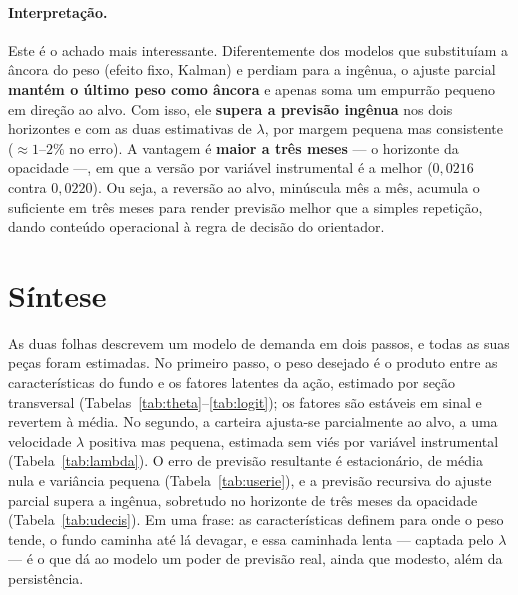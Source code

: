\documentclass[11pt,a4paper]{article}
\begin{document}
\paragraph{Interpretação.} Este é o achado mais interessante. Diferentemente dos modelos que
substituíam a âncora do peso (efeito fixo, Kalman) e perdiam para a ingênua, o ajuste parcial
\textbf{mantém o último peso como âncora} e apenas soma um empurrão pequeno em direção ao alvo. Com
isso, ele \textbf{supera a previsão ingênua} nos dois horizontes e com as duas estimativas de
$\lambda$, por margem pequena mas consistente ($\approx1$--$2\%$ no erro). A vantagem é \textbf{maior
a três meses} --- o horizonte da opacidade ---, em que a versão por variável instrumental é a melhor
($0{,}0216$ contra $0{,}0220$). Ou seja, a reversão ao alvo, minúscula mês a mês, acumula o
suficiente em três meses para render previsão melhor que a simples repetição, dando conteúdo
operacional à regra de decisão do orientador.

\section{Síntese}

As duas folhas descrevem um modelo de demanda em dois passos, e todas as suas peças foram estimadas.
No primeiro passo, o peso desejado é o produto entre as características do fundo e os fatores latentes
da ação, estimado por seção transversal (Tabelas~\ref{tab:theta}--\ref{tab:logit}); os fatores são
estáveis em sinal e revertem à média. No segundo, a carteira ajusta-se parcialmente ao alvo, a uma
velocidade $\lambda$ positiva mas pequena, estimada sem viés por variável instrumental
(Tabela~\ref{tab:lambda}). O erro de previsão resultante é estacionário, de média nula e variância
pequena (Tabela~\ref{tab:userie}), e a previsão recursiva do ajuste parcial supera a ingênua,
sobretudo no horizonte de três meses da opacidade (Tabela~\ref{tab:udecis}). Em uma frase: as
características definem para onde o peso tende, o fundo caminha até lá devagar, e essa caminhada
lenta --- captada pelo $\lambda$ --- é o que dá ao modelo um poder de previsão real, ainda que
modesto, além da persistência.
\end{document}
